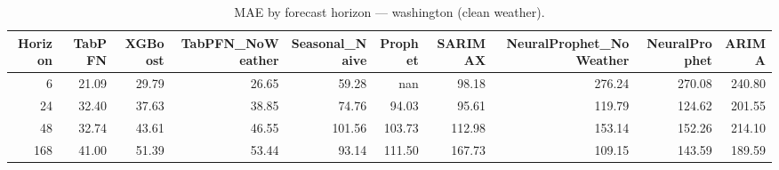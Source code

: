 \begin{table}[ht!]
\centering
\caption{MAE by forecast horizon — washington (clean weather).}
\label{tab:mae_by_horizon_washington}
\begin{tabular}{rrrrrrrrrr}
\toprule
Horizon & TabPFN & XGBoost & TabPFN_NoWeather & Seasonal_Naive & Prophet & SARIMAX & NeuralProphet_NoWeather & NeuralProphet & ARIMA \\
\midrule
6 & 21.09 & 29.79 & 26.65 & 59.28 & nan & 98.18 & 276.24 & 270.08 & 240.80 \\
24 & 32.40 & 37.63 & 38.85 & 74.76 & 94.03 & 95.61 & 119.79 & 124.62 & 201.55 \\
48 & 32.74 & 43.61 & 46.55 & 101.56 & 103.73 & 112.98 & 153.14 & 152.26 & 214.10 \\
168 & 41.00 & 51.39 & 53.44 & 93.14 & 111.50 & 167.73 & 109.15 & 143.59 & 189.59 \\
\bottomrule
\end{tabular}
\end{table}
